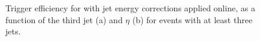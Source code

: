 \begin{figure}[hbtp]
  \centering
  \hfill
  \caption[\HLTThreeCentralPFJet trigger efficiency as a function of the third jet \pt and $\eta$]{Trigger
  efficiency for \HLTThreeCentralPFJet with jet energy corrections applied online, as a function of the third jet \pt (a) and $\eta$
  (b) for events with at least three jets.}
\label{fig:top_hlt_pt_eta_JEC_3jets} 
\end{figure}

